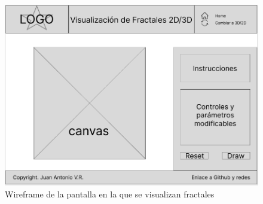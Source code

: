 \begin{figure} [ht]
    \centering
    \includegraphics[width=12cm]{img/wireframe-1.png}
    \caption{Wireframe de la pantalla en la que se visualizan fractales}
        \label{fig:wireframe-fractals}
    \end{figure}